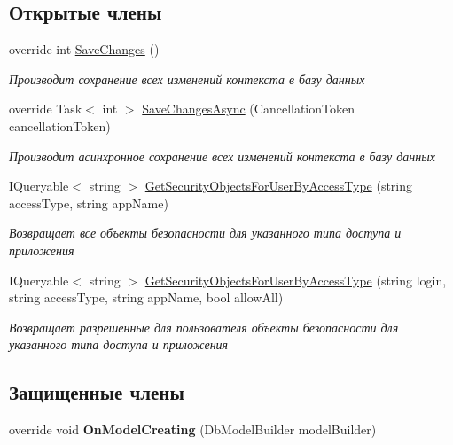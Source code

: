 \subsection*{Открытые члены}
\begin{DoxyCompactItemize}
\item 
override int \hyperlink{class_security_1_1_entity_dal_1_1_security_context_a61ee472223cdf5feb7372ca5e9813412}{Save\+Changes} ()
\begin{DoxyCompactList}\small\item\em Производит сохранение всех изменений контекста в базу данных \end{DoxyCompactList}\item 
override Task$<$ int $>$ \hyperlink{class_security_1_1_entity_dal_1_1_security_context_acaeaf0c56dcf6802fb8c0a9bd1d6cf76}{Save\+Changes\+Async} (Cancellation\+Token cancellation\+Token)
\begin{DoxyCompactList}\small\item\em Производит асинхронное сохранение всех изменений контекста в базу данных \end{DoxyCompactList}\item 
I\+Queryable$<$ string $>$ \hyperlink{class_security_1_1_entity_dal_1_1_security_context_a5a36dad07c6c54b8ec86c6674ed8fa24}{Get\+Security\+Objects\+For\+User\+By\+Access\+Type} (string access\+Type, string app\+Name)
\begin{DoxyCompactList}\small\item\em Возвращает все объекты безопасности для указанного типа доступа и приложения \end{DoxyCompactList}\item 
I\+Queryable$<$ string $>$ \hyperlink{class_security_1_1_entity_dal_1_1_security_context_a7e1fcf7450b038382dc13d16c8a06a47}{Get\+Security\+Objects\+For\+User\+By\+Access\+Type} (string login, string access\+Type, string app\+Name, bool allow\+All)
\begin{DoxyCompactList}\small\item\em Возвращает разрешенные для пользователя объекты безопасности для указанного типа доступа и приложения \end{DoxyCompactList}\end{DoxyCompactItemize}
\subsection*{Защищенные члены}
\begin{DoxyCompactItemize}
\item 
\mbox{\label{class_security_1_1_entity_dal_1_1_security_context_a827b16f5e931901bbd85eb92ad4708dd}} 
override void {\bfseries On\+Model\+Creating} (Db\+Model\+Builder model\+Builder)
\end{DoxyCompactItemize}
